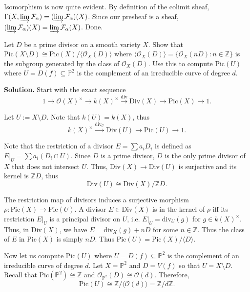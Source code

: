 \documentclass{template}
\begin{document}
Isomorphism is now quite evident. By definition of the colimit sheaf,
$\Gamma(X, \varinjlim \mathcal{F}_{\alpha}) = (\varinjlim \mathcal{F}_{\alpha})(X)$.
Since our presheaf is a sheaf, $(\varinjlim \mathcal{F}_{\alpha})(X) = \varinjlim \mathcal{F}_{\alpha}(X)$.
Done.

\begin{problem}[Exercise 5]
    Let $D$ be a prime divisor on a smooth variety $X$.
    Show that $\text{Pic}(X \setminus D) \cong \text{Pic}(X) / \langle \mathcal{O}_X(D) \rangle$
    where $\langle \mathcal{O}_X(D) \rangle = \{\mathcal{O}_X(nD): n \in \mathbb{Z}\}$ is the subgroup generated by the class of $\mathcal{O}_X(D)$.
    Use this to compute $\text{Pic}(U)$ where $U = D(f) \subseteq \mathbb{P}^2$ is the complement of an irreducible curve of degree $d$.
\end{problem}

\textbf{Solution.} Start with the exact sequence
\begin{equation*}
    1 \to \mathcal{O}(X)^{\times} \to k(X)^{\times} \xrightarrow{\text{div}} \text{Div}(X) \to \text{Pic}(X) \to 1.
\end{equation*}

Let $U := X \setminus D$. Note that $k(U)=k(X)$, thus
\begin{equation*}
    k(X)^{\times} \xrightarrow{\text{div}_U} \text{Div}(U) \to \text{Pic}(U) \to 1.
\end{equation*}

Note that the restriction of a divisor $E=\sum a_iD_i$ is defined as 
$E|_U = \sum a_i(D_i \cap U)$. Since $D$ is a prime divisor, $D$ is 
the only prime divisor of $X$ that does not intersect $U$. Thus, 
$\text{Div}(X) \to \text{Div}(U)$ is surjective and its kernel is $\mathbb{Z}D$, thus
\begin{equation*}
    \text{Div}(U) \cong \text{Div}(X)/\mathbb{Z}D.
\end{equation*}

The restriction map of divisors induces a surjective morphism $\rho:
\text{Pic}(X) \to \text{Pic}(U)$. A divisor $E \in \text{Div}(X)$ is in 
the kernel of $\rho$ iff its restriction $E|_{U}$ is a principal divisor 
on $U$, i.e. $E|_U = \text{div}_U(g)$ for $g \in k(X)^{\times}$.
Thus, in $\text{Div}(X)$, we have $E = \text{div}_X(g) + nD$ for some $n \in \mathbb{Z}$.
Thus the class of $E$ in $\text{Pic}(X)$ is simply $nD$. Thus 
$\text{Pic}(U) = \text{Pic}(X)/\langle D \rangle$.

Now let us compute $\text{Pic}(U)$ where $U = D(f) \subseteq \mathbb{P}^2$ is the complement of an irreducible curve of degree $d$.
Let $X=\mathbb{P}^2$ and $D=V(f)$ so that $U = X \setminus D$. 
Recall that $\text{Pic}(\mathbb{P}^2)\cong \mathbb{Z}$ and 
$\mathcal{O}_{\mathbb{P}^2}(D) \cong \mathcal{O}(d)$.
Therefore,
\begin{equation*}
    \text{Pic}(U) \cong \mathbb{Z} / \langle \mathcal{O}(d) \rangle = \mathbb{Z}/d\mathbb{Z}.
\end{equation*}

\nocite{*}
\renewcommand{\refname}{}


\end{document}
